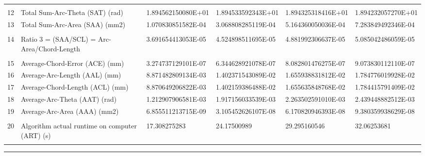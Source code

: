 \begin{landscape}
\begin{table}[ht]
{\begin{tabular}{ p{0.2cm} p{8.80cm} p{4.00cm} p{4.0cm} p{4.00cm} p{4.0cm}}
&		&		&		&		&		\\
12	&	Total Sum-Arc-Theta (SAT) (rad)	&	1.894562150080E+01	&	1.894533592343E+01	&	1.894325318416E+01	&	1.894232057270E+01	\\
13	&	Total Sum-Arc-Area (SAA) (mm2)	&	1.070830851582E-04	&	3.068808285119E-04	&	5.164360050036E-04	&	7.283849492346E-04	\\
&		&		&		&		&		\\
14	&	Ratio 3 = (SAA/SCL) = Arc-Area/Chord-Length	&	3.691654413053E-05	&	4.524898511695E-05	&	4.881992306637E-05	&	5.085042486059E-05	\\
&		&		&		&		&		\\
15	&	Average-Chord-Error (ACE) (mm)	&	3.274737129101E-07	&	6.344628921078E-07	&	8.082801476275E-07	&	9.073830112110E-07	\\
16	&	Average-Arc-Length (AAL) (mm)	&	8.871482809134E-03	&	1.402371543089E-02	&	1.655938831812E-02	&	1.784776019928E-02	\\
17	&	Average-Chord-Length (ACL) (mm)	&	8.870649206822E-03	&	1.402159386488E-02	&	1.655635848768E-02	&	1.784415791409E-02	\\
18	&	Average-Arc-Theta (AAT) (rad)	&	1.212907906581E-03	&	1.917156033539E-03	&	2.263502591010E-03	&	2.439448882512E-03	\\
19	&	Average-Arc-Area (AAA) (mm2)	&	6.855511213715E-09	&	3.105452626107E-08	&	6.170820946393E-08	&	9.380359938629E-08	\\
&		&		&		&		&		\\
20	&	Algorithm actual runtime on computer (ART) (s) 	&	17.308275283	&	24.17500989	&	29.295160546	&	32.06253681	\\
&		&		&		&		&		

\end{tabular}
			
}   %
\hrule
\end{table}
\end{landscape}

